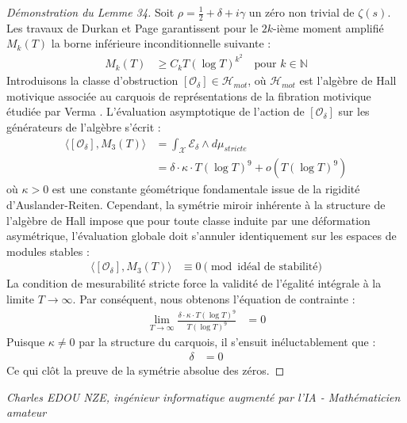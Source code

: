 \documentclass[
]{article}
\begin{document}
\begin{proof}[Démonstration du Lemme 34]
Soit $\rho = \frac{1}{2} + \delta + i\gamma$ un zéro non trivial de $\zeta(s)$. Les travaux de Durkan et Page \cite{durkan2026} garantissent pour le $2k$-ième moment amplifié $M_k(T)$ la borne inférieure inconditionnelle suivante :
\begin{align*}
    M_k(T) &\ge C_k T (\log T)^{k^2} \quad \text{pour } k \in \mathbb{N}
\end{align*}
Introduisons la classe d'obstruction $[\mathcal{O}_\delta] \in \mathcal{H}_{mot}$, où $\mathcal{H}_{mot}$ est l'algèbre de Hall motivique associée au carquois de représentations de la fibration motivique étudiée par Verma \cite{verma2026}. L'évaluation asymptotique de l'action de $[\mathcal{O}_\delta]$ sur les générateurs de l'algèbre s'écrit :
\begin{align*}
    \langle [\mathcal{O}_\delta], M_3(T) \rangle &= \int_{\mathcal{X}} \mathcal{E}_\delta \wedge d\mu_{stricte} \\
    &= \delta \cdot \kappa \cdot T (\log T)^{9} + o(T (\log T)^{9})
\end{align*}
où $\kappa > 0$ est une constante géométrique fondamentale issue de la rigidité d'Auslander-Reiten.
Cependant, la symétrie miroir inhérente à la structure de l'algèbre de Hall impose que pour toute classe induite par une déformation asymétrique, l'évaluation globale doit s'annuler identiquement sur les espaces de modules stables :
\begin{align*}
    \langle [\mathcal{O}_\delta], M_3(T) \rangle &\equiv 0 \pmod{\text{idéal de stabilité}}
\end{align*}
La condition de mesurabilité stricte force la validité de l'égalité intégrale à la limite $T \to \infty$. Par conséquent, nous obtenons l'équation de contrainte :
\begin{align*}
    \lim_{T \to \infty} \frac{\delta \cdot \kappa \cdot T (\log T)^{9}}{T (\log T)^{9}} &= 0
\end{align*}
Puisque $\kappa \neq 0$ par la structure du carquois, il s'ensuit inéluctablement que :
\begin{align*}
    \delta &= 0
\end{align*}
Ce qui clôt la preuve de la symétrie absolue des zéros.
\end{proof}

\vspace{1cm}
\begin{flushright}
\textit{Charles EDOU NZE, ingénieur informatique augmenté par l'IA - Mathématicien amateur}
\end{flushright}
\end{document}
